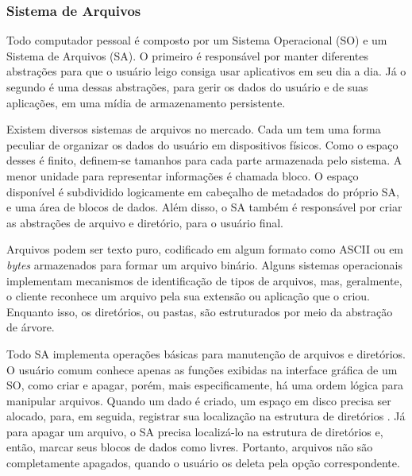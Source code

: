     \subsubsection{Sistema de Arquivos} \label{cap1_visao_geral_sa}
    
    \hspace{1cm}
    Todo computador pessoal é composto por um Sistema Operacional (SO) e um Sistema de Arquivos (SA). O primeiro é responsável por manter diferentes abstrações para que o usuário leigo consiga usar aplicativos em seu dia a dia. Já o segundo é uma dessas abstrações, para gerir os dados do usuário e de suas aplicações, em uma mídia de armazenamento persistente.
    
    \vspace{4mm}

    \hspace{1cm}
    Existem diversos sistemas de arquivos no mercado. Cada um tem uma forma peculiar de organizar os dados do usuário em dispositivos físicos. Como o espaço desses é finito, definem-se tamanhos para cada parte armazenada pelo sistema. A menor unidade para representar informações é chamada bloco. O espaço disponível é subdividido logicamente em cabeçalho de metadados do próprio SA, e uma área de blocos de dados. Além disso, o SA também é responsável por criar as abstrações de arquivo e diretório, para o usuário final.
    
    \vspace{4mm}
    
    \hspace{1cm}
    Arquivos podem ser texto puro, codificado em algum formato como ASCII ou em \textit{bytes} armazenados para formar um arquivo binário. Alguns sistemas operacionais implementam mecanismos de identificação de tipos de arquivos, mas, geralmente, o cliente reconhece um arquivo pela sua extensão ou aplicação que o criou. Enquanto isso, os diretórios, ou pastas, são estruturados por meio da abstração de árvore.
    
    \vspace{4mm}
    
    \hspace{1cm}
    Todo SA implementa operações básicas para manutenção de arquivos e diretórios. O usuário comum conhece apenas as funções exibidas na interface gráfica de um SO, como criar e apagar, porém, mais especificamente, há uma ordem lógica para manipular arquivos. Quando um dado é criado, um espaço em disco precisa ser alocado, para, em seguida, registrar sua localização na estrutura de diretórios \cite{silberschatz2018}. Já para apagar um arquivo, o SA precisa localizá-lo na estrutura de diretórios e, então, marcar seus blocos de dados como livres. Portanto, arquivos não são completamente apagados, quando o usuário os deleta pela opção correspondente.
    

